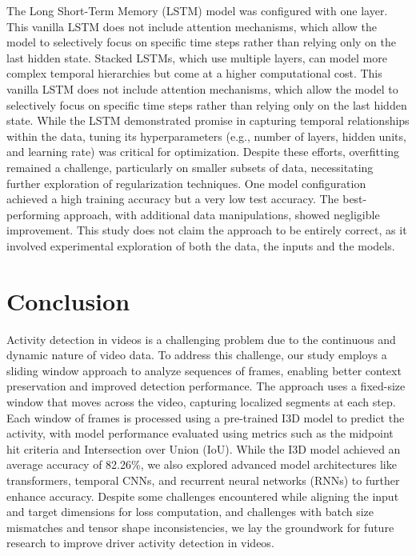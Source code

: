 \documentclass{article}
\begin{document}
The Long Short-Term Memory (LSTM) model was configured with one layer. This vanilla LSTM does not include attention mechanisms, which allow the model to selectively focus on specific time steps rather than relying only on the last hidden state. Stacked LSTMs, which use multiple layers, can model more complex temporal hierarchies but come at a higher computational cost. This vanilla LSTM does not include attention mechanisms, which allow the model to selectively focus on specific time steps rather than relying only on the last hidden state. While the LSTM demonstrated promise in capturing temporal relationships within the data, tuning its hyperparameters (e.g., number of layers, hidden units, and learning rate) was critical for optimization. Despite these efforts, overfitting remained a challenge, particularly on smaller subsets of data, necessitating further exploration of regularization techniques. One model configuration achieved a high training accuracy but a very low test accuracy. The best-performing approach, with additional data manipulations, showed negligible improvement. This study does not claim the approach to be entirely correct, as it involved experimental exploration of both the data, the inputs and the models.
\section{Conclusion}
Activity detection in videos is a challenging problem due to the continuous and dynamic nature of video data. To address this challenge, our study employs a sliding window approach to analyze sequences of frames, enabling better context preservation and improved detection performance. The approach uses a fixed-size window that moves across the video, capturing localized segments at each step. Each window of frames is processed using a pre-trained I3D model to predict the activity, with model performance evaluated using metrics such as the midpoint hit criteria and Intersection over Union (IoU). While the I3D model achieved an average accuracy of 82.26\%, we also explored advanced model architectures like transformers, temporal CNNs, and recurrent neural networks (RNNs) to further enhance accuracy. Despite some challenges encountered while aligning the input and target dimensions for loss computation, and challenges with batch size mismatches and tensor shape inconsistencies, we lay the groundwork for future research to improve driver activity detection in videos.


\end{document}
